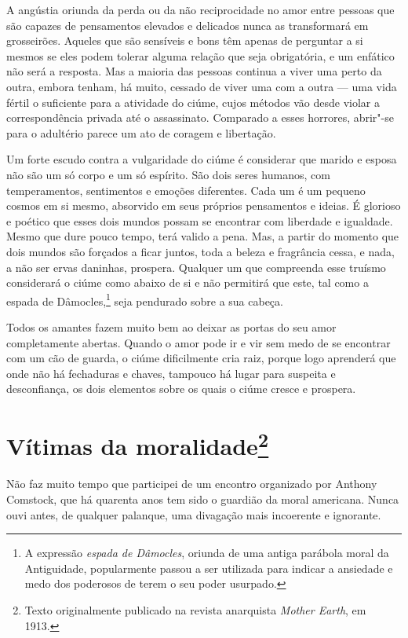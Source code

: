 A angústia oriunda da perda ou da não reciprocidade no amor entre
pessoas que são capazes de pensamentos elevados e delicados nunca as
transformará em grosseirões. Aqueles que são sensíveis e bons têm apenas
de perguntar a si mesmos se eles podem tolerar alguma relação que seja
obrigatória, e um enfático não será a resposta. Mas a maioria das
pessoas continua a viver uma perto da outra, embora tenham, há muito,
cessado de viver uma com a outra --- uma vida fértil o suficiente para a
atividade do ciúme, cujos métodos vão desde violar a correspondência
privada até o assassinato. Comparado a esses horrores, abrir"-se para o
adultério parece um ato de coragem e libertação.

Um forte escudo contra a vulgaridade do ciúme é considerar que marido e
esposa não são um só corpo e um só espírito. São dois seres humanos, com
temperamentos, sentimentos e emoções diferentes. Cada um é um pequeno
cosmos em si mesmo, absorvido em seus próprios pensamentos e ideias. É
glorioso e poético que esses dois mundos possam se encontrar com
liberdade e igualdade. Mesmo que dure pouco tempo, terá valido a pena.
Mas, a partir do momento que dois mundos são forçados a ficar juntos,
toda a beleza e fragrância cessa, e nada, a não ser ervas daninhas,
prospera. Qualquer um que compreenda esse truísmo considerará o ciúme
como abaixo de si e não permitirá que este, tal como a espada de
Dâmocles,\footnote{A expressão \textit{espada de Dâmocles}, oriunda de uma antiga parábola moral da Antiguidade, popularmente passou a ser utilizada para indicar a ansiedade e medo dos poderosos de terem o seu poder usurpado.} seja pendurado sobre a sua cabeça.

Todos os amantes fazem muito bem ao deixar as portas do seu amor
completamente abertas. Quando o amor pode ir e vir sem medo de se
encontrar com um cão de guarda, o ciúme dificilmente cria raiz, porque
logo aprenderá que onde não há fechaduras e chaves, tampouco há lugar
para suspeita e desconfiança, os dois elementos sobre os quais o ciúme
cresce e prospera.

\chapter{Vítimas da moralidade\footnote{Texto originalmente publicado na revista
  anarquista \textit{Mother Earth}, em 1913.}}

Não faz muito tempo que participei de um encontro organizado por Anthony
Comstock, que há quarenta anos tem sido o guardião da moral americana.
Nunca ouvi antes, de qualquer palanque, uma divagação mais incoerente e
ignorante.


